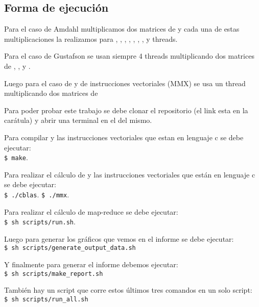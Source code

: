 \subsection{Forma de ejecución}
    Para el caso de Amdahl multiplicamos dos matrices de  y cada
    una de estas multiplicaciones la realizamos para , ,
    , , , , ,  y 
    threads.

    \hfill \break
    Para el caso de Gustafson se usan siempre 4 threads multiplicando dos matrices
    de , , y .

    \hfill \break
    Luego para el caso de  y de instrucciones vectoriales (MMX)
    se usa un thread multiplicando dos matrices de 

    \hfill \break
    Para poder probar este trabajo se debe clonar el repositorio (el link esta
    en la carátula) y abrir una terminal en el  del mismo.

    \hfill \break
    Para compilar  y las instrucciones vectoriales que estan en
    lenguaje c se debe ejecutar: \\
    \lstinline[columns=fixed]{$ make}.

    \hfill \break
    Para realizar el cálculo de   y las instrucciones vectoriales
    que están en lenguaje c se debe ejecutar: \\
    \lstinline[columns=fixed]{$ ./cblas}.
    \lstinline[columns=fixed]{$ ./mmx}.

    \hfill \break
    Para realizar el cálculo de map-reduce se debe ejecutar: \\
    \lstinline[columns=fixed]{$ sh scripts/run.sh}.

    \hfill \break
    Luego para generar los gráficos que vemos en el informe se debe
    ejecutar: \\
    \lstinline[columns=fixed]{$ sh scripts/generate_output_data.sh}

    \hfill \break
    Y finalmente para generar el informe debemos ejecutar: \\
    \lstinline[columns=fixed]{$ sh scripts/make_report.sh}

    \hfill \break
    También hay un script que corre estos últimos tres comandos en un solo script:\\
    \lstinline[columns=fixed]{$ sh scripts/run_all.sh}

